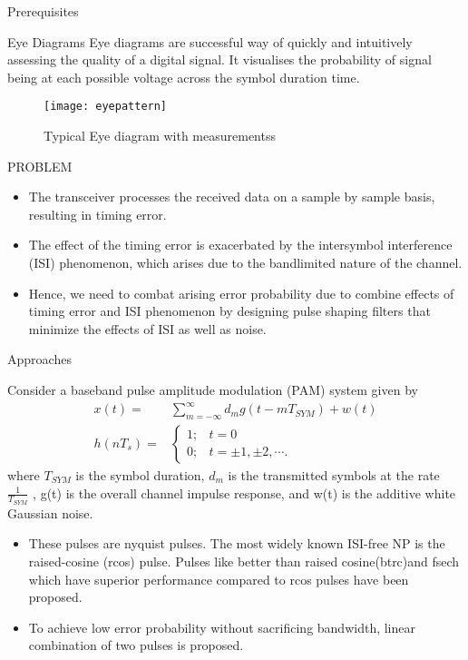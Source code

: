 \documentclass[10pt]{beamer}
\begin{document}
\begin{frame}{Prerequisites}
\begin{block}{Eye Diagrams}
Eye diagrams are successful way of quickly and intuitively assessing the quality of a digital signal. It visualises the probability of signal being at each possible voltage across the symbol duration time.
\begin{figure}[h]
    \centering
    \texttt{[image: eyepattern]}
    \caption{Typical Eye diagram with measurementss}
\end{figure}

\end{block}
 
   
\end{frame}
\begin{frame}{PROBLEM}
\begin{itemize}


\item The transceiver processes the received data on a sample by sample basis, resulting in timing error. \\
\item The effect of the timing error is exacerbated by the intersymbol
interference (ISI) phenomenon, which arises due to the bandlimited nature of the channel.\\
\item Hence, we need to combat arising error probability due to combine effects of timing error and ISI phenomenon by designing pulse shaping filters that minimize the effects of ISI as well as noise.
\end{itemize}
\end{frame}
\begin{frame}{Approaches}
\begin{block}


Consider a baseband pulse amplitude modulation (PAM) system given by
\begin{align}
x(t) ={}&\sum_{m=-\infty}^{\infty}d_{m}g(t-mT_{SYM}) + w(t)\\
h(nT_{s})={}&
\begin{cases}
1; & t=0\\
0; & t=\pm1,\pm2,\cdots.
\end{cases}
\end{align}
where $T_{SYM}$ is the symbol duration, $d_{m}$ is the transmitted
symbols at the rate $\frac{1}{T_{SYM}}$ , g(t) is the overall channel impulse response, and w(t) is the additive white Gaussian noise.
\begin{itemize}
\item These pulses are nyquist pulses. The most widely known ISI-free NP is the raised-cosine (rcos) pulse. Pulses like better than raised cosine(btrc)and fsech which have superior performance compared to rcos pulses have been proposed.
\item To achieve low error probability without sacrificing bandwidth,  linear combination of two pulses is proposed.
\end{itemize}
\end{block}  
\end{frame}
\end{document}
